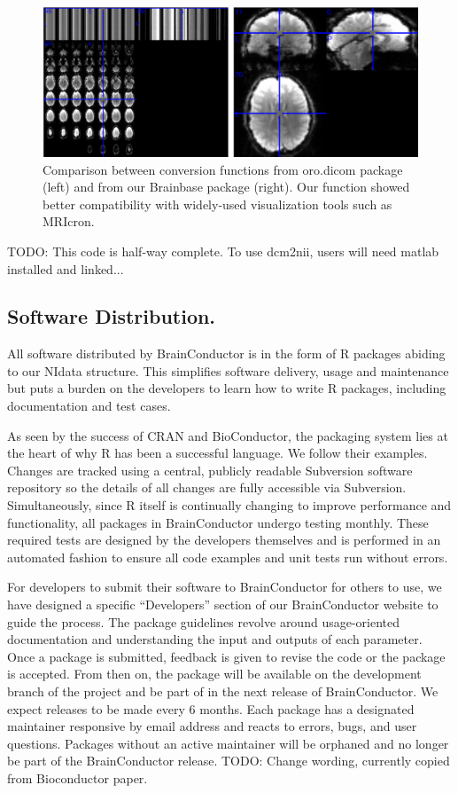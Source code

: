 \documentclass{nature}
\begin{document}
\begin{figure}[tb]
\centering
\includegraphics[width=400pt]{fig/brainconductor/dicom.png}
\caption{Comparison between conversion functions from oro.dicom package (left) and from our Brainbase  package (right).  Our function showed better compatibility  with widely-used visualization tools such as MRIcron.}
\label{fig:dicom}
\end{figure}


{\color{red}TODO: This code is half-way complete. To use dcm2nii, users will
need
matlab installed and linked...}




\subsection{Software Distribution.}

All software distributed by BrainConductor is in the form of R packages abiding
to our NIdata structure. This
simplifies software delivery, usage and maintenance but puts a burden on the
developers
to learn how to write R packages, including documentation and test cases.

As seen by the success of CRAN and BioConductor, the packaging system lies
at the heart of why R has been a successful language. We follow their examples.
Changes are tracked using a central, publicly readable Subversion software
repository
so the details of all changes are fully accessible via Subversion.
Simultaneously, since
R itself is continually changing to improve performance and functionality, all
packages
in BrainConductor undergo testing monthly. These required tests are designed by
the
developers themselves and is performed in an automated fashion to ensure
all code examples and unit tests run without errors.

For developers to submit their software to BrainConductor for others to use,
we have designed a specific ``Developers'' section of our BrainConductor website
to guide the process. The package guidelines revolve around usage-oriented
documentation and understanding the input and outputs of each parameter.
 Once
a package is submitted, feedback is given to revise the code or the package is
accepted.
From then on, the package will be available on the
development branch of the project and be part of in the next release of
BrainConductor.
We expect releases to be made every 6 months.
Each package has a designated maintainer responsive by email address and reacts
to
errors, bugs, and user questions. Packages without an active maintainer will be
orphaned and no longer be part of the BrainConductor release.
{\color{red}TODO: Change wording, currently copied from Bioconductor paper.}
\end{document}
